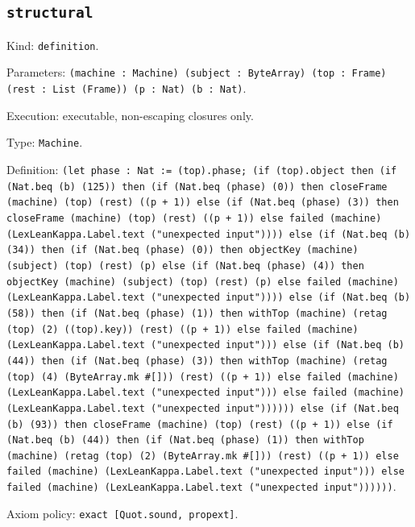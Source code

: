 \documentclass[11pt]{article}
\begin{document}
\subsection*{\texttt{structural}}
\noindent Kind: \texttt{definition}.\par
\noindent Parameters: \texttt{(machine : Machine) (subject : ByteArray) (top : Frame) (rest : List (Frame)) (p : Nat) (b : Nat)}.\par
\noindent Execution: executable, non-escaping closures only.\par
\noindent Type: \texttt{Machine}.\par
\noindent Definition: \texttt{(let phase : Nat := (top).phase; (if (top).object then (if (Nat.beq (b) (125)) then (if (Nat.beq (phase) (0)) then closeFrame (machine) (top) (rest) ((p + 1)) else (if (Nat.beq (phase) (3)) then closeFrame (machine) (top) (rest) ((p + 1)) else failed (machine) (LexLeanKappa.Label.text ("unexpected input")))) else (if (Nat.beq (b) (34)) then (if (Nat.beq (phase) (0)) then objectKey (machine) (subject) (top) (rest) (p) else (if (Nat.beq (phase) (4)) then objectKey (machine) (subject) (top) (rest) (p) else failed (machine) (LexLeanKappa.Label.text ("unexpected input")))) else (if (Nat.beq (b) (58)) then (if (Nat.beq (phase) (1)) then withTop (machine) (retag (top) (2) ((top).key)) (rest) ((p + 1)) else failed (machine) (LexLeanKappa.Label.text ("unexpected input"))) else (if (Nat.beq (b) (44)) then (if (Nat.beq (phase) (3)) then withTop (machine) (retag (top) (4) (ByteArray.mk \#[])) (rest) ((p + 1)) else failed (machine) (LexLeanKappa.Label.text ("unexpected input"))) else failed (machine) (LexLeanKappa.Label.text ("unexpected input")))))) else (if (Nat.beq (b) (93)) then closeFrame (machine) (top) (rest) ((p + 1)) else (if (Nat.beq (b) (44)) then (if (Nat.beq (phase) (1)) then withTop (machine) (retag (top) (2) (ByteArray.mk \#[])) (rest) ((p + 1)) else failed (machine) (LexLeanKappa.Label.text ("unexpected input"))) else failed (machine) (LexLeanKappa.Label.text ("unexpected input"))))))}.\par
\noindent Axiom policy: \texttt{exact [Quot.sound, propext]}.\par
\end{document}
